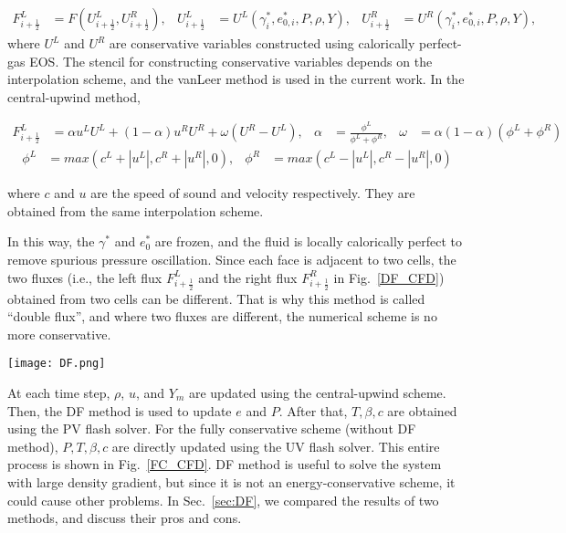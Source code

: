 \begin{align}
F^L_{i+\frac{1}{2}}& = F\left(U^L_{i+\frac{1}{2}},U^R_{i+\frac{1}{2}}\right),&
U^L_{i+\frac{1}{2}}& = U^L\left(\gamma^*_i,e_{0,i}^*,P,\rho ,Y\right),&
U^R_{i+\frac{1}{2}}& = U^R\left(\gamma^*_i,e_{0,i}^*,P,\rho ,Y\right),
\end{align}
where $U^L$ and $U^R$ are conservative variables constructed using calorically perfect-gas EOS. The stencil for constructing conservative variables depends on the interpolation scheme, and the vanLeer method \cite{van1974towards} is used in the current work. In the central-upwind method,

\begin{align} F^L_{i+\frac{1}{2}} &= \alpha u^LU^L + \left(1-\alpha\right)u^R U^R + \omega \left(U^R-U^L\right),&
\alpha &= \frac{\phi^L}{\phi^L +\phi^R},&
 \omega &= \alpha \left(1-\alpha\right) \left(\phi^L+\phi^R\right)
 \end{align}
\begin{align} \phi^L& = max\left(c^L+|u^L|,c^R + |u^R|,0\right),&\phi^R &= max\left(c^L-|u^L|,c^R - |u^R|,0\right)
\end{align}

where $c$ and $u$ are the speed of sound and velocity respectively. They are obtained from the same interpolation scheme.


In this way, the $\gamma^*$ and $e_0^*$ are frozen, and the fluid is locally calorically perfect to remove spurious pressure oscillation. 
Since each face is adjacent to two cells, the two fluxes (i.e., the left flux $F^L_{i+\frac{1}{2}}$ and the right flux $F^R_{i+\frac{1}{2}}$ in Fig.~\ref{DF_CFD}) obtained from two cells can be different. That is why this method is called ``double flux'', and where two fluxes are different, the numerical scheme is no more conservative. 
\begin{figure*}[htbp]
\centering
\texttt{[image: DF.png]}
\caption{Schematic of the double flux (DF) method in a one-dimensional mesh.}
\label{DF_CFD} 
\end{figure*}

At each time step, $\rho$, $u$, and $Y_m$ are updated using the central-upwind scheme. Then, the DF method is used to update $e$ and $P$. After that, $T,\beta,c$ are obtained using the PV flash solver. For the fully conservative scheme (without DF method), $P,T,\beta,c$ are directly updated using the UV flash solver. This entire process is shown in Fig.~\ref{FC_CFD}. DF method is useful to solve the system with large density gradient, but since it is not an energy-conservative scheme, it could cause other problems. In Sec.~\ref{sec:DF}, we compared the results of two methods, and discuss their pros and cons.

